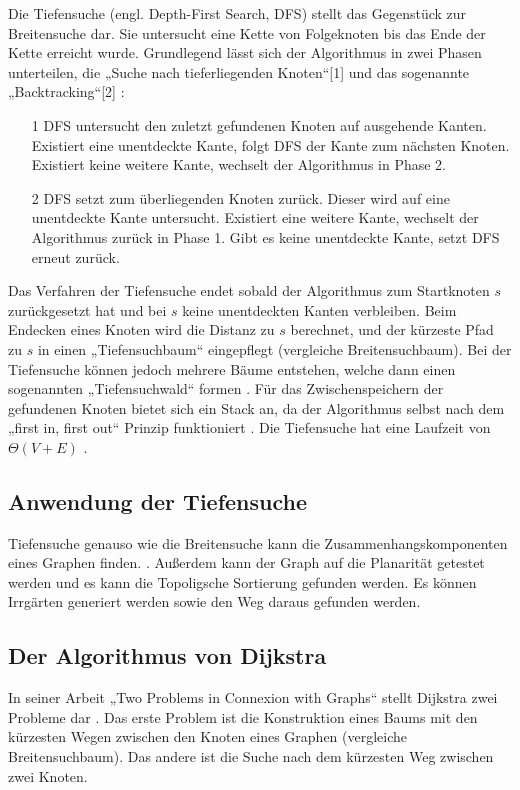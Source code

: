 Die Tiefensuche (engl. Depth-First Search, DFS) stellt das Gegenstück zur Breitensuche dar. Sie untersucht eine Kette von Folgeknoten bis das Ende der Kette erreicht wurde. Grundlegend lässt sich der Algorithmus in zwei Phasen unterteilen, die „Suche nach tieferliegenden Knoten“[1] und das sogenannte „Backtracking“[2] \cite{Tarjan.1972}:
\begin{itemize}
	\item[1] DFS untersucht den zuletzt gefundenen Knoten auf ausgehende Kanten. Existiert eine unentdeckte Kante, folgt DFS der Kante zum nächsten Knoten. Existiert keine weitere Kante, wechselt der Algorithmus in Phase 2.
	\item[2] DFS setzt zum überliegenden Knoten zurück. Dieser wird auf eine unentdeckte Kante untersucht. Existiert eine weitere Kante, wechselt der Algorithmus zurück in Phase 1. Gibt es keine unentdeckte Kante, setzt DFS erneut zurück.
\end{itemize}
Das Verfahren der Tiefensuche endet sobald der Algorithmus zum Startknoten $s$ zurückgesetzt hat und bei $s$ keine unentdeckten Kanten verbleiben. Beim Endecken eines Knoten wird die Distanz zu $s$ berechnet, und der kürzeste Pfad zu $s$ in einen „Tiefensuchbaum“ eingepflegt (vergleiche Breitensuchbaum). Bei der Tiefensuche können jedoch mehrere Bäume entstehen, welche dann einen sogenannten „Tiefensuchwald“ formen \cite{Cormen.2009}. 
Für das Zwischenspeichern der gefundenen Knoten bietet sich ein Stack an, da der Algorithmus selbst nach dem „first in, first out“ Prinzip funktioniert \cite{Tarjan.1972}. Die Tiefensuche hat eine Laufzeit von $\Theta(V + E)$ \cite{Cormen.2009}.


\subsection{Anwendung der Tiefensuche}
Tiefensuche genauso wie die Breitensuche kann die Zusammenhangskomponenten eines Graphen finden. \cite{schmitz} \cite{dfs}. Außerdem kann der Graph auf die Planarität \cite{dfsPlanar} getestet werden und es kann die Topoligsche Sortierung gefunden werden. Es können Irrgärten generiert werden sowie den Weg daraus gefunden werden\cite{examMaze}. %


\subsection{Der Algorithmus von Dijkstra}
In seiner Arbeit „Two Problems in Connexion with Graphs“ stellt Dijkstra zwei Probleme dar \cite{Dijkstra.1959}. Das erste Problem ist die Konstruktion eines Baums mit den kürzesten Wegen zwischen den Knoten eines Graphen (vergleiche Breitensuchbaum). Das andere ist die Suche nach dem kürzesten Weg zwischen zwei Knoten.

